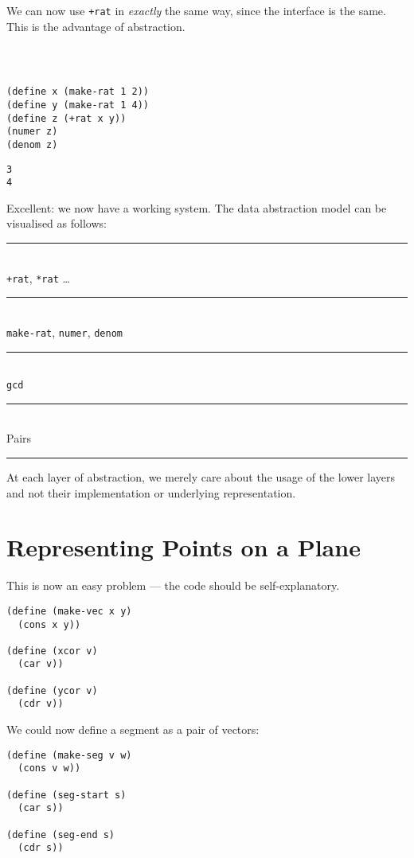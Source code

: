 \documentclass[9pt]{report}
\begin{document}
We can now use \texttt{+rat} in \emph{exactly} the same way, since the
interface is the same. This is the advantage of abstraction.

\begin{verbatim}



(define x (make-rat 1 2))
(define y (make-rat 1 4))
(define z (+rat x y))
(numer z)
(denom z)
\end{verbatim}

\begin{verbatim}
3
4
\end{verbatim}


Excellent: we now have a working system. The data abstraction
model can be visualised as follows:

\begin{center}
\rule{6cm}{2pt}\\
\texttt{+rat}, \texttt{*rat} \ldots{}\\
\rule{6cm}{2pt}\\
\texttt{make-rat}, \texttt{numer}, \texttt{denom}\\
\rule{6cm}{2pt}\\
\texttt{gcd}\\
\rule{6cm}{2pt}\\
Pairs\\
\rule{6cm}{2pt}
\end{center}

At each layer of abstraction, we merely care about the usage of
the lower layers and not their implementation or underlying
representation.

\section{Representing Points on a Plane}
\label{sec:orgb4c17b5}

This is now an easy problem --- the code should be
self-explanatory.

\begin{verbatim}
(define (make-vec x y)
  (cons x y))

(define (xcor v)
  (car v))

(define (ycor v)
  (cdr v))
\end{verbatim}

We could now define a segment as a pair of vectors:

\begin{verbatim}
(define (make-seg v w)
  (cons v w))

(define (seg-start s)
  (car s))

(define (seg-end s)
  (cdr s))
\end{verbatim}
\end{document}
